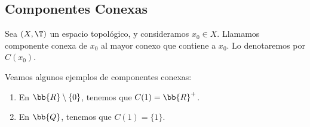 \subsection{Componentes Conexas}
\begin{definicion}
    Sea $(X,\T)$ un espacio topológico, y consideramos $x_0\in X$. Llamamos componente conexa de $x_0$ al mayor conexo que contiene a $x_0$. Lo denotaremos por $C(x_0)$.
\end{definicion}
\begin{ejemplo}
    Veamos algunos ejemplos de componentes conexas:
    \begin{enumerate}
        \item En $\bb{R}\setminus \{0\}$, tenemos que $C(1)=\bb{R}^+$.
        \item En $\bb{Q}$, tenemos que $C(1)=\{1\}$.
    \end{enumerate}
\end{ejemplo}


